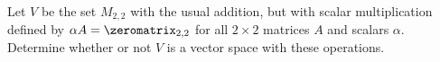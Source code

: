 %
Let $V$ be the set $M_{2,2}$ with the usual  addition, but with scalar multiplication defined by 
$\alpha A= \zeromatrix_{2,2}$ for all $2 \times 2$ matrices $A$ and scalars $\alpha$.
Determine whether or not $V$ is a vector space with these operations. 